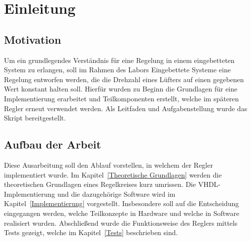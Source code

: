 \chapter{Einleitung}

\section{Motivation}
Um ein grundlegendes Verständnis für eine Regelung in einem eingebetteten System zu erlangen, soll im Rahmen des Labors Eingebettete Systeme eine Regelung entworfen werden, die die Drehzahl eines Lüfters auf einen gegebenen Wert konstant halten soll. Hierfür wurden zu Beginn die Grundlagen für eine Implementierung erarbeitet und Teilkomponenten erstellt, welche im späteren Regler erneut verwendet werden. Als Leitfaden und Aufgabenstellung wurde das Skript \cite{LES16} bereitgestellt.

\section{Aufbau der Arbeit}
Diese Ausarbeitung soll den Ablauf vorstellen, in welchem der Regler implementiert wurde. Im Kapitel~\ref{Theoretische Grundlagen} werden die theoretischen Grundlagen eines Regelkreises kurz umrissen. Die VHDL-Implementierung und die dazugehörige Software wird im Kapitel~\ref{Implementierung} vorgestellt. Insbesondere soll auf die Entscheidung eingegangen werden, welche Teilkonzepte in Hardware und welche in Software realisiert wurden. Abschließend wurde die Funktionsweise des Reglers mittels Tests gezeigt, welche im Kapitel~\ref{Tests} beschrieben sind.